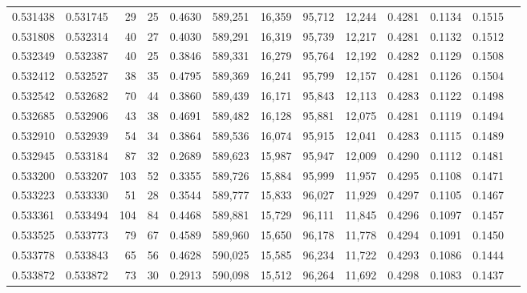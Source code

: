 \begin{tabular}{rrrrrrrrrrrrr}
0.531438 & 0.531745 &    29 &    25 &                                     0.4630 & 589,251 &  16,359 &  95,712 &  12,244 & 0.4281 & 0.1134 & 0.1515 \\
0.531808 & 0.532314 &    40 &    27 &                                     0.4030 & 589,291 &  16,319 &  95,739 &  12,217 & 0.4281 & 0.1132 & 0.1512 \\
0.532349 & 0.532387 &    40 &    25 &                                     0.3846 & 589,331 &  16,279 &  95,764 &  12,192 & 0.4282 & 0.1129 & 0.1508 \\
0.532412 & 0.532527 &    38 &    35 &                                     0.4795 & 589,369 &  16,241 &  95,799 &  12,157 & 0.4281 & 0.1126 & 0.1504 \\
0.532542 & 0.532682 &    70 &    44 &                                     0.3860 & 589,439 &  16,171 &  95,843 &  12,113 & 0.4283 & 0.1122 & 0.1498 \\
0.532685 & 0.532906 &    43 &    38 &                                     0.4691 & 589,482 &  16,128 &  95,881 &  12,075 & 0.4281 & 0.1119 & 0.1494 \\
0.532910 & 0.532939 &    54 &    34 &                                     0.3864 & 589,536 &  16,074 &  95,915 &  12,041 & 0.4283 & 0.1115 & 0.1489 \\
0.532945 & 0.533184 &    87 &    32 &                                     0.2689 & 589,623 &  15,987 &  95,947 &  12,009 & 0.4290 & 0.1112 & 0.1481 \\
0.533200 & 0.533207 &   103 &    52 &                                     0.3355 & 589,726 &  15,884 &  95,999 &  11,957 & 0.4295 & 0.1108 & 0.1471 \\
0.533223 & 0.533330 &    51 &    28 &                                     0.3544 & 589,777 &  15,833 &  96,027 &  11,929 & 0.4297 & 0.1105 & 0.1467 \\
0.533361 & 0.533494 &   104 &    84 &                                     0.4468 & 589,881 &  15,729 &  96,111 &  11,845 & 0.4296 & 0.1097 & 0.1457 \\
0.533525 & 0.533773 &    79 &    67 &                                     0.4589 & 589,960 &  15,650 &  96,178 &  11,778 & 0.4294 & 0.1091 & 0.1450 \\
0.533778 & 0.533843 &    65 &    56 &                                     0.4628 & 590,025 &  15,585 &  96,234 &  11,722 & 0.4293 & 0.1086 & 0.1444 \\
0.533872 & 0.533872 &    73 &    30 &                                     0.2913 & 590,098 &  15,512 &  96,264 &  11,692 & 0.4298 & 0.1083 & 0.1437 \\

\end{tabular}
